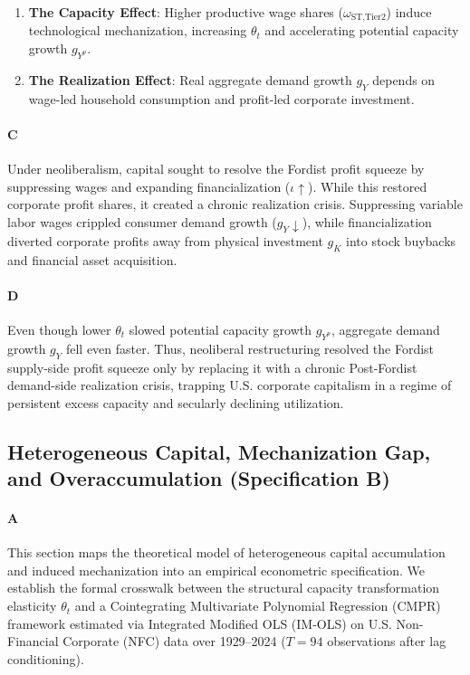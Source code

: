 \begin{enumerate}
	\item \textbf{The Capacity Effect}: Higher productive wage shares ($\omega_{\text{ST,Tier2}}$) induce technological mechanization, increasing $\theta_t$ and accelerating potential capacity growth $g_{Y^p}$.
	\item \textbf{The Realization Effect}: Real aggregate demand growth $g_Y$ depends on wage-led household consumption and profit-led corporate investment.
\end{enumerate}

\paragraph{C}
Under neoliberalism, capital sought to resolve the Fordist profit squeeze by suppressing wages and expanding financialization ($\iota \uparrow$). While this restored corporate profit shares, it created a chronic realization crisis. Suppressing variable labor wages crippled consumer demand growth ($g_Y \downarrow$), while financialization diverted corporate profits away from physical investment $g_K$ into stock buybacks and financial asset acquisition.

\paragraph{D}
Even though lower $\theta_t$ slowed potential capacity growth $g_{Y^p}$, aggregate demand growth $g_Y$ fell even faster. Thus, neoliberal restructuring resolved the Fordist supply-side profit squeeze only by replacing it with a chronic Post-Fordist demand-side realization crisis, trapping U.S. corporate capitalism in a regime of persistent excess capacity and secularly declining utilization.

\subsection{Heterogeneous Capital, Mechanization Gap, and Overaccumulation (Specification B)}

\paragraph{A}
This section maps the theoretical model of heterogeneous capital accumulation and induced mechanization into an empirical econometric specification. We establish the formal crosswalk between the structural capacity transformation elasticity $\theta_t$ and a Cointegrating Multivariate Polynomial Regression (CMPR) framework estimated via Integrated Modified OLS (IM-OLS) on U.S. Non-Financial Corporate (NFC) data over 1929–2024 ($T = 94$ observations after lag conditioning).

